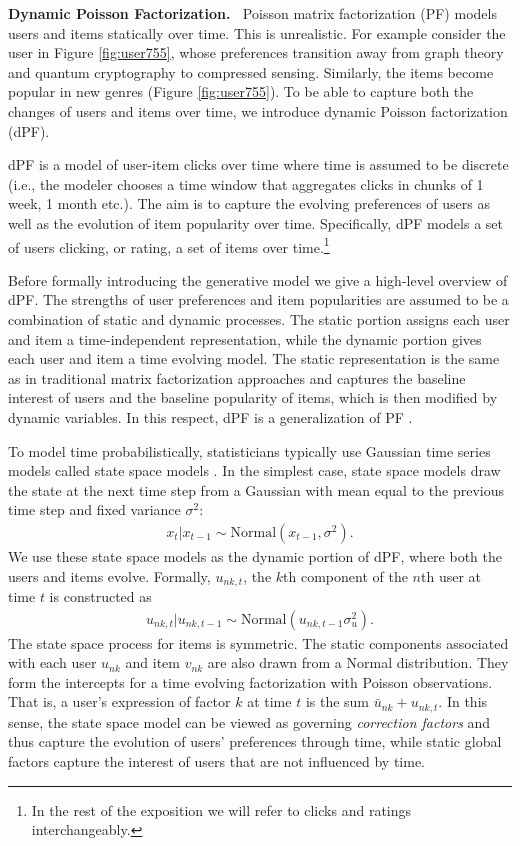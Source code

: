 \documentclass{sig-alternate}
\newcommand{\mypar}[1]{\vspace{0.1in}\noindent \textbf{#1 \,}}
\begin{document}
\mypar{Dynamic Poisson Factorization.}
Poisson matrix factorization (PF) models users and items statically over time.
This is unrealistic. For example consider the user in Figure \ref{fig:user755}, whose
preferences transition away from graph theory and quantum cryptography to compressed
sensing. Similarly, the items become popular in new genres (Figure \ref{fig:user755}). 
To be able to capture both the changes of 
users and items over time, we introduce dynamic Poisson factorization (dPF). 


dPF is a model of user-item clicks over time where time is assumed to be
discrete (i.e., the modeler chooses a time window that
aggregates clicks in chunks of 1 week, 1 month etc.). The aim is to 
capture the evolving preferences of users as well
as the evolution of item popularity over time. Specifically, dPF models a
set of users clicking, or rating, a set of items over time.\footnote{In the rest of
the exposition we will refer to clicks and ratings interchangeably.}

Before formally introducing the generative model we give a high-level
overview of dPF. The strengths of user preferences and item popularities
are assumed to be a combination of static and dynamic processes. The
static portion assigns each user and item a time-independent
representation, while the dynamic portion gives each user and item a time
evolving model.  The static representation is
the same as in traditional matrix factorization approaches and captures the
baseline interest of users and the baseline popularity of items, which is
then modified by dynamic variables. In this respect, dPF is a
generalization of PF \citep{Gopalan:2013b}.


To model time probabilistically, statisticians typically use Gaussian time
series models called state space models \citep{bishop:2006:PRML}. In the
simplest case, state space models draw the state at the next time step from a
Gaussian with mean equal to the previous time step and fixed variance
$\sigma^2$:
\begin{align*}
x_{t} | x_{t-1}  \sim \textrm{Normal}(x_{t-1}, \sigma^2).
\end{align*}
We use these state space models as the dynamic portion of dPF, where both
the users and items evolve. Formally,
$u_{nk,t}$, the $k$th component of the $n$th user at time $t$ is 
constructed as
\begin{align*}
u_{nk,t} | u_{nk,t-1} \sim \textrm{Normal}(u_{nk,t-1} \sigma_u^2).
\end{align*}
The state space process for items is symmetric. The static components associated
with each user $u_{nk}$ and item $v_{nk}$ are also drawn from a Normal distribution. 
They form the intercepts for a time evolving factorization with Poisson observations.
That is, a user's expression of factor $k$ at time $t$ is the sum $\bar{u}_{nk} + u_{nk,t}$. In this sense,
the state space model can be viewed as governing \emph{correction factors} and thus capture the evolution of users'
preferences through time, while static global factors capture the interest
of users that are not influenced by time. 
\end{document}
